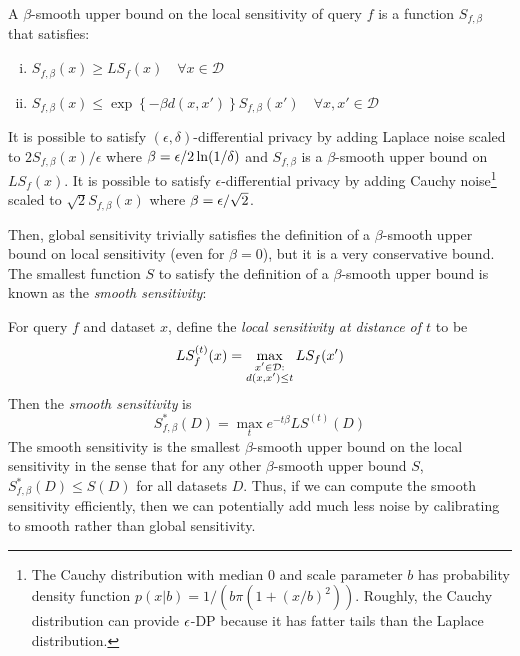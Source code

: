 \begin{theorem}
\label{thm:smooth}
A $\beta$-smooth upper bound on the local sensitivity of query $f$ is a function $S_{f, \beta}$ that satisfies:
\vspace{-0.2in}
\begin{enumerate}[(i)]
	\item $S_{f, \beta}(x) \geq LS_f(x) \quad \forall x \in \mathcal{D}$
	\item $S_{f, \beta} (x) \leq \exp\left\{- \beta d(x, x') \right\} S_{f, \beta}(x') \quad \forall x, x' \in \mathcal{D}$
\end{enumerate}
\vspace{-0.2in}
It is possible to satisfy $(\epsilon, \delta)$-differential privacy by adding Laplace noise scaled to $2S_{f,\beta}(x)/\epsilon$ where $\beta = \epsilon/2 \ln(1/\delta)$ and $S_{f, \beta}$ is a $\beta$-smooth upper bound on $LS_f(x)$. It is possible to satisfy $\epsilon$-differential privacy by adding Cauchy noise\footnote{The Cauchy distribution with median $0$ and scale parameter $b$ has probability density function $p(x|b) = 1/(b \pi(1+(x/b)^2 ) )$. Roughly, the Cauchy distribution can provide $\epsilon$-DP because it has fatter tails than the Laplace distribution.} scaled to $\sqrt{2}S_{f, \beta}(x)$ where $\beta = \epsilon/\sqrt{2}$.
\end{theorem}

 Then, global sensitivity trivially satisfies the definition of a $\beta$-smooth upper bound on local sensitivity (even for $\beta = 0$), but it is a very conservative bound. The smallest function $S$ to satisfy the definition of a $\beta$-smooth upper bound is known as the \emph{smooth sensitivity}:
\begin{definition}
\label{def:smooth}
For query $f$ and dataset $x$, define the \emph{local sensitivity at distance of $t$} to be
$$LS_f^{(t)}(x) = \max_{\substack{x' \in \mathcal{D}:\\ d(x, x') \leq t}} LS_f(x')$$
Then the \emph{smooth sensitivity} is
$$S^*_{f, \beta}(D) = \max_{t} e^{-t \beta}  LS^{(t)}(D)$$
The smooth sensitivity is the smallest $\beta$-smooth upper bound on the local sensitivity in the sense that for any other $\beta$-smooth upper bound $S$, $S^*_{f, \beta}(D) \leq S(D)$ for all datasets $D$. Thus, if we can compute the smooth sensitivity efficiently, then we can potentially add much less noise by calibrating to smooth rather than global sensitivity.
\end{definition}

